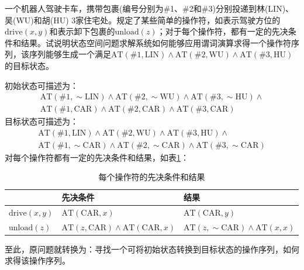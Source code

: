 \begin{question}
一个机器人驾驶卡车，携带包裹(编号分别为\#1、\#2和\#3)分别投递到林(LIN)、吴(WU)和胡(HU) 3家住宅处。规定了某些简单的操作符，如表示驾驶方位的$\mathrm{drive}(x,y)$和表示卸下包裹的$\mathrm{unload}(z)$；对于每个操作符，都有一定的先决条件和结果。试说明状态空间问题求解系统如何能够应用谓词演算求得一个操作符序列，该序列能够生成一个满足$\mathrm{AT(\# 1,LIN) \wedge AT(\# 2,WU) \wedge AT(\# 3,HU)}$的目标状态。
\end{question}
\begin{solution}
初始状态可描述为：
	\begin{multline*}
	\mathrm{AT}(\#1, \sim \mathrm{LIN}) \wedge \mathrm{AT}(\#2, \sim \mathrm{WU}) \wedge \mathrm{AT}(\#3, \sim \mathrm{HU}) \wedge {} \\
	\mathrm{AT}(\#1, \mathrm{CAR}) \wedge \mathrm{AT}(\#2, \mathrm{CAR}) \wedge \mathrm{AT}(\#3, \mathrm{CAR})
	\end{multline*} 
目标状态可描述为：
	\begin{multline*}
	\mathrm{AT}(\#1, \mathrm{LIN}) \wedge \mathrm{AT}(\#2, \mathrm{WU}) \wedge \mathrm{AT}(\#3, \mathrm{HU}) \wedge {} \\
	\mathrm{AT}(\#1, \sim \mathrm{CAR}) \wedge \mathrm{AT}(\#2, \sim \mathrm{CAR}) \wedge \mathrm{AT}(\#3, \sim \mathrm{CAR})
	\end{multline*}
对每个操作符都有一定的先决条件和结果，如表\ref{tab:operators}：
	\begin{table}[htbp]
	\centering
	\begin{tabular}{p{50pt}p{130pt}p{130pt}}
		\toprule
		~ & 先决条件 & 结果 \\
		\midrule
		$\mathrm{drive}(x,y)$ & $\mathrm{AT}(\mathrm{CAR}, x)$ & $\mathrm{AT}(\mathrm{CAR}, y)$ \\
		\midrule
		$\mathrm{unload}(z)$ & $\mathrm{AT}(z, \mathrm{CAR}) \wedge \mathrm{AT}(\mathrm{CAR}, x)$ 
			& $\mathrm{AT}(z, \sim\mathrm{CAR}) \wedge \mathrm{AT}(x, x)$ \\
		\bottomrule
	\end{tabular}
	\caption{每个操作符的先决条件和结果}\label{tab:operators}
	\end{table} \par
至此，原问题就转换为：寻找一个可将初始状态转换到目标状态的操作序列，如何求得该操作序列。
\end{solution}

